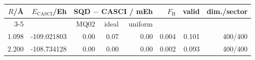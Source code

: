 \begin{tabular}{rrrrrrrr}
\toprule
$R$/\AA & $E_\mathrm{CASCI}$/Eh & \multicolumn{3}{c}{SQD $-$ CASCI / mEh} & $F_\mathrm{H}$ & valid & dim./sector \\
\cmidrule(lr){3-5}
 & & MQ02 & ideal & uniform & & & \\
\midrule
1.098 & -109.021803 & 0.00 & 0.07 & 0.00 & 0.004 & 0.101 & 400/400 \\
2.200 & -108.734128 & 0.00 & 0.00 & 0.00 & 0.002 & 0.093 & 400/400 \\
\bottomrule
\end{tabular}
